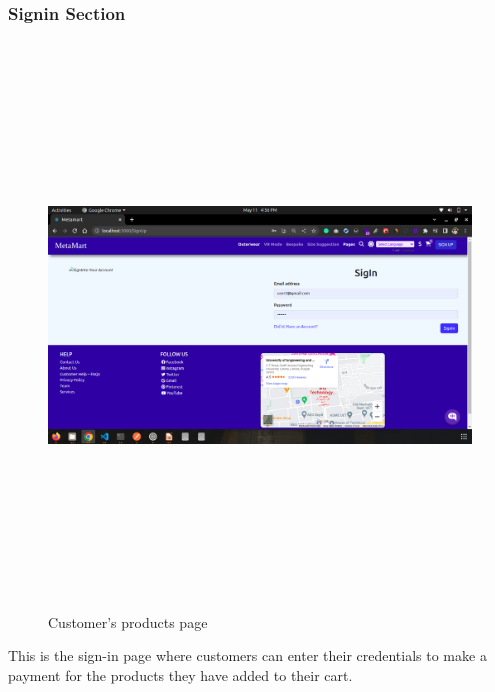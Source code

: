 \subsubsection{Signin Section}
\begin{figure}[H]
    \centering
    \includegraphics[width=15cm,height=15cm]{Figures/Websites/Customer/CustomerSignin.png}
    \caption{Customer’s products page}
    \label{fig:SignIn Page}
\end{figure}
\justifying

This is the sign-in page where customers can enter their credentials to make a payment for the products they have added to their cart.
